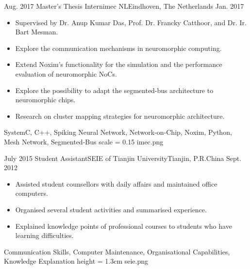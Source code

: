 %
%
%
%
%

\begin{experiences}
	\experience
    {Aug. 2017}	{Master's Thesis Intern}{imec NL}{Eindhoven, The Netherlands}
    {Jan. 2017}	{
    				\begin{itemize}
                    	\item Supervised by Dr. Anup Kumar Das, Prof. Dr. Francky Catthoor, and Dr. Ir. Bart Mesman.
    					\item Explore the communication mechanisms in neuromorphic computing.
                        \item Extend Noxim's functionality for the simulation and the performance evaluation of neuromorphic NoCs.
                        \item Explore the possibility to adapt the segmented-bus architecture to neuromorphic chips. 
                        \item Research on cluster mapping strategies for neuromorphic architecture.
    				\end{itemize}
    			}
                {SystemC, C++, Spiking Neural Network, Network-on-Chip, Noxim, Python, Mesh Network, Segmented-Bus}
     {scale = 0.15}		{imec.png} 
	\emptySeparator
    
    
    \experience
    {July 2015}	{Student Assistant}{SEIE of Tianjin University}{Tianjin, P.R.China}
    {Sept. 2012}	{
    				\begin{itemize}
                    	\item Assisted student counsellors with daily affairs and maintained office computers. 
    					\item Organised several student activities and summarised experience.
                        \item Explained knowledge points of professional courses to students who have learning difficulties.
    				\end{itemize}
    			}
                {Communication Skills, Computer Maintenance, Organisational Capabilities, Knowledge Explanation}
     {height = 1.3cm}		{seie.png} 
    
\end{experiences}
